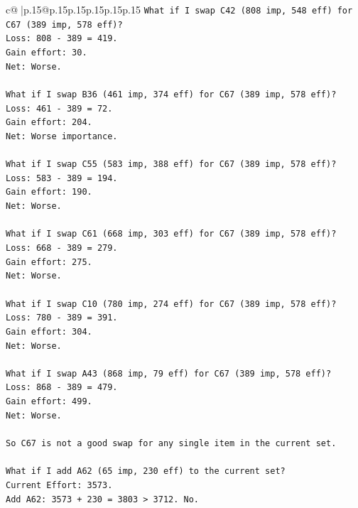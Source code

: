 \documentclass{article}
\begin{document}
{\begin{supertabular}{c@{$\;$}|p{.15\linewidth}@{}p{.15\linewidth}p{.15\linewidth}p{.15\linewidth}p{.15\linewidth}p{.15\linewidth}}
{{{\texttt{What if I swap C42 (808 imp, 548 eff) for C67 (389 imp, 578 eff)?} \\
\texttt{Loss: 808 {-} 389 = 419.} \\
\texttt{Gain effort: 30.} \\
\texttt{Net: Worse.} \\
\\ 
\texttt{What if I swap B36 (461 imp, 374 eff) for C67 (389 imp, 578 eff)?} \\
\texttt{Loss: 461 {-} 389 = 72.} \\
\texttt{Gain effort: 204.} \\
\texttt{Net: Worse importance.} \\
\\ 
\texttt{What if I swap C55 (583 imp, 388 eff) for C67 (389 imp, 578 eff)?} \\
\texttt{Loss: 583 {-} 389 = 194.} \\
\texttt{Gain effort: 190.} \\
\texttt{Net: Worse.} \\
\\ 
\texttt{What if I swap C61 (668 imp, 303 eff) for C67 (389 imp, 578 eff)?} \\
\texttt{Loss: 668 {-} 389 = 279.} \\
\texttt{Gain effort: 275.} \\
\texttt{Net: Worse.} \\
\\ 
\texttt{What if I swap C10 (780 imp, 274 eff) for C67 (389 imp, 578 eff)?} \\
\texttt{Loss: 780 {-} 389 = 391.} \\
\texttt{Gain effort: 304.} \\
\texttt{Net: Worse.} \\
\\ 
\texttt{What if I swap A43 (868 imp, 79 eff) for C67 (389 imp, 578 eff)?} \\
\texttt{Loss: 868 {-} 389 = 479.} \\
\texttt{Gain effort: 499.} \\
\texttt{Net: Worse.} \\
\\ 
\texttt{So C67 is not a good swap for any single item in the current set.} \\
\\ 
\texttt{What if I add A62 (65 imp, 230 eff) to the current set?} \\
\texttt{Current Effort: 3573.} \\
\texttt{Add A62: 3573 + 230 = 3803 > 3712. No.} \\
}}}
\end{supertabular}}
\end{document}
